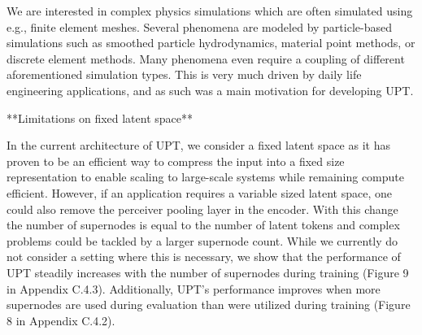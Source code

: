 We are interested in complex physics simulations which are often simulated using e.g., finite element meshes. Several phenomena are modeled by particle-based simulations such as smoothed particle hydrodynamics, material point methods, or discrete element methods. Many phenomena even require a coupling of different aforementioned simulation types. This is very much driven by daily life engineering applications, and as such was a main motivation for developing UPT.





**Limitations on fixed latent space**


In the current architecture of UPT, we consider a fixed latent space as it has proven to be an efficient way to compress the input into a fixed size representation to enable scaling to large-scale systems while remaining compute efficient.
However, if an application requires a variable sized latent space, one could also remove the perceiver pooling layer in the encoder. With this change the number of supernodes is equal to the number of latent tokens and complex problems could be tackled by a larger supernode count. While we currently do not consider a setting where this is necessary, we show that the performance of UPT steadily increases with the number of supernodes during training (Figure 9 in Appendix C.4.3).
Additionally, UPT's performance improves when more supernodes are used during evaluation than were utilized during training (Figure 8 in Appendix C.4.2).